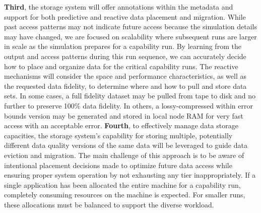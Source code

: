 \documentclass[11pt,letterpaper]{article}
\begin{document}
%
\textbf{Third}, the storage system will offer annotations within the metadata
and support for both predictive and reactive data placement and migration.
While past access patterns may not indicate future access because the
simulation details may have changed, we are focused on scalability where
subsequent runs are larger in scale as the simulation prepares for a capability run.  By
learning from the output and access patterns during this run sequence, we can
accurately decide how to place and organize data for the critical capability
runs. The reactive mechanisms will consider the space and performance
characteristics, as well as the requested data fidelity, to determine where and
how to pull and store data sets. In some cases, a full fidelity dataset may be pulled
from tape to disk and no further to preserve 100\% data fidelity. In others, a
lossy-compressed within error bounds version may be generated and stored in
local node RAM for very fast access with an acceptable error.
%
\textbf{Fourth}, to effectively manage data storage capacities, the storage
system's capability for storing multiple, potentially different data quality
versions of the same data will be leveraged to guide data eviction and migration. 
The main challenge of this approach is to be aware of intentional placement
decisions made to optimize future data access while ensuring proper system
operation by not exhausting any tier inappropriately. If a single application
has been allocated the entire machine for a capability run, completely
consuming resources on the machine is expected. For smaller runs, these
allocations must be balanced to support the diverse workload.
\end{document}
